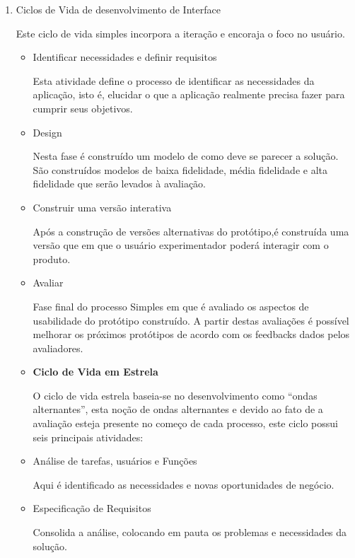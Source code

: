 \begin{enumerate}

\item{Ciclos de Vida de desenvolvimento de Interface}

Este ciclo de vida simples incorpora a iteração e encoraja o foco no usuário.

\begin{itemize}
\item Identificar necessidades e definir requisitos

Esta atividade define o processo de identificar as necessidades da aplicação, isto é, elucidar o que a aplicação realmente precisa fazer para cumprir seus objetivos.

\item Design

Nesta fase é construído um modelo de como deve se parecer a solução. São construídos modelos de baixa fidelidade, média fidelidade e alta fidelidade que serão levados à avaliação.

\item Construir uma versão interativa

Após a construção de versões alternativas do protótipo,é construída uma versão que em que o usuário experimentador poderá interagir com o produto.		

\item Avaliar

Fase final do processo Simples em que é avaliado os aspectos de usabilidade do protótipo construído. A partir destas avaliações é possível melhorar os próximos protótipos de acordo com os feedbacks dados pelos avaliadores.

\item \textbf{Ciclo de Vida em Estrela}

O ciclo de vida estrela baseia-se no desenvolvimento como “ondas alternantes”, esta noção de ondas alternantes e devido ao fato de a avaliação esteja presente no começo de cada processo, este ciclo possui  seis principais atividades:

\item Análise de tarefas, usuários e Funções

Aqui é identificado as necessidades e novas oportunidades de negócio.

\item Especificação de Requisitos

Consolida a análise, colocando em pauta os problemas e necessidades da solução.


\end{itemize}
\end{enumerate}
